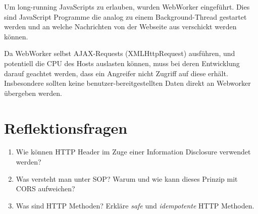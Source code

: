 Um long-running JavaScripts zu erlauben, wurden WebWorker eingeführt. Dies sind JavaScript Programme die analog zu einem Background-Thread gestartet werden und an welche Nachrichten von der Webseite aus verschickt werden können.

Da WebWorker selbst AJAX-Requests (XMLHttpRequest) ausführen, und potentiell die CPU des Hosts auslasten können, muss bei deren Entwicklung darauf geachtet werden, dass ein Angreifer nicht Zugriff auf diese erhält. Insbesondere sollten keine benutzer-bereitgestellten Daten direkt an Webworker übergeben werden.

\section{Reflektionsfragen}

\begin{enumerate}
	\item Wie können HTTP Header im Zuge einer Information Disclosure verwendet werden?
	\item Was versteht man unter SOP? Warum und wie kann dieses Prinzip mit CORS aufweichen?
	\item Was sind HTTP Methoden? Erkläre \textit{safe} und \textit{idempotente} HTTP Methoden.
\end{enumerate}

